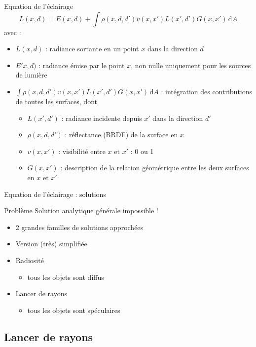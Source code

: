\begin{frame}{Equation de l'éclairage}
    $$
    L(x,d) = E(x,d) + \int \rho(x,d,d')v(x,x')L(x',d')G(x,x')  \,\mathrm{d}A 
    $$
avec :
\begin{itemize}
    \item $L(x,d)$ : radiance sortante en un point $x$ dans la direction $d$ 
    \item $E'x,d)$ : radiance émise par le point $x$, non nulle uniquement pour les sources de lumière
    \item $\int \rho(x,d,d')v(x,x')L(x',d')G(x,x')  \,\mathrm{d}A$ : intégration des contributions de toutes les surfaces, dont
    \begin{itemize}
        \item $L(x',d')$ : radiance incidente depuis $x'$ dans la direction $d'$
        \item $\rho(x,d,d')$ : réflectance (BRDF) de la surface en $x$ 
        \item $v(x,x')$ : visibilité entre $x$ et $x'$ : 0 ou 1 
        \item $G(x,x')$ : description de la relation géométrique entre les deux surfaces en $x$ et $x'$
    \end{itemize}
\end{itemize}
\end{frame}

\begin{frame}{Equation de l'éclairage : solutions}
\begin{block}{Problème}
    Solution analytique générale impossible !
\end{block}
\begin{itemize}
    \item 2 grandes familles de solutions approchées
    \item Version (très) simplifiée
    \item Radiosité 
    \begin{itemize}
        \item tous les objets sont diffus 
    \end{itemize}
    \item Lancer de rayons 
    \begin{itemize}
        \item tous les objets sont spéculaires 
    \end{itemize}
\end{itemize}
\end{frame}

\subsection{Lancer de rayons}

